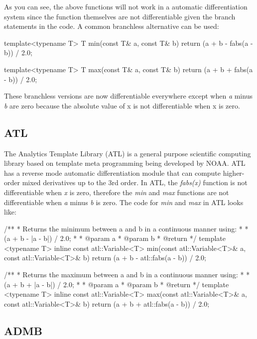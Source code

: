 \documentclass[oneside]{article}
\begin{document}
As you can see, the above functions will not work in a automatic differentiation system since the function themselves are not differentiable given the branch statements in the code. A common branchless alternative can be used:
\begin{cppsource}
template<typename T>
T min(const T& a, const T& b){
   return (a + b - fabs(a - b)) / 2.0;
} 

template<typename T>
T max(const T& a, const T& b){
   return (a + b + fabs(a - b)) / 2.0;
} 
\end{cppsource}

These branchless versions are now differentiable everywhere except when \textit{a} minus \textit{b} are  zero because the absolute value of x is not differentiable when x is zero. 

\subsection{ATL}
The Analytics Template Library (ATL) is a general purpose scientific computing library based on template meta programming being developed by NOAA. ATL has a reverse mode automatic differentiation module that can compute higher-order mixed derivatives up to the 3rd order. In ATL, the \textit{fabs(x)} function is not differentiable when \textit{x} is zero, therefore the \textit{min} and \textit{max} functions are not differentiable when \textit{a} minus \textit{b} is zero. The code for \textit{min} and \textit{max} in ATL looks like: 
\begin{cppsource}

/**
 * Returns the minimum between a and b in a continuous manner using:
 * 
 * (a + b - |a - b|) / 2.0;
 * 
 * @param a
 * @param b
 * @return 
 */
template <typename T>
inline const atl::Variable<T> min(const atl::Variable<T>& a, 
	const atl::Variable<T>& b) {
    return (a + b - atl::fabs(a - b)) / 2.0;
}

/**
 * Returns the maximum between a and b in a continuous manner using:
 * 
 * (a + b + |a - b|) / 2.0;
 * 
 * @param a
 * @param b
 * @return 
 */
template <typename T>
inline const atl::Variable<T> max(const atl::Variable<T>& a, 
	const atl::Variable<T>& b) {
    return (a + b + atl::fabs(a - b)) / 2.0;
}


\end{cppsource} 


\subsection{ADMB}
\end{document}
